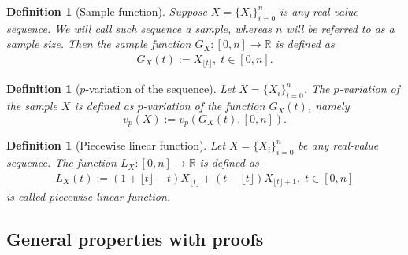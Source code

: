 \documentclass[12pt, a4paper]{article}
\newtheorem{definition}[theorem]{Definition}
\numberwithin{equation}{section}
\begin{document}
\begin{definition}[Sample function]\label{def:Seq2Fun}
  Suppose $X=\{X_{i}\}_{i=0}^{n}$ is any real-value sequence. 
  We will call such sequence a \emph{sample}, 
  whereas $n$ will be referred to as a \emph{sample size}.
  Then the \emph{sample function}  
  $G_X:[0,n] \rightarrow \mathbb{R}$ is defined as 
  \begin{eqnarray}
    G_X(t) := X_{\lfloor t \rfloor},\;t\in[0,n].
  \end{eqnarray}
\end{definition} 

\begin{definition}[$p$-variation of the sequence]\label{def:pvarseq}
  Let $X=\{X_i\}_{i=0}^n$. The $p$-variation
  of the sample $X$ is defined as $p$-variation of the function $G_X(t)$, namely
  \begin{equation}
    v_p(X) := v_p(G_X(t),[0,n]).
  \end{equation}
\end{definition}

\begin{definition}[Piecewise linear function]\label{def:poligon}
  Let $X=\{X_i\}_{i=0}^n$ be any real-value sequence. 
  The function $L_X:[0,n] \rightarrow \mathbb{R}$ is defined as
  \begin{eqnarray}
  L_X(t) := (1+\lfloor t \rfloor-t)X_{\lfloor t \rfloor} + (t-\lfloor t \rfloor)X_{\lfloor t \rfloor+1}   ,\;t\in[0,n]
  \end{eqnarray}
  is called \emph{piecewise linear function}.
\end{definition}


\subsection{General properties with proofs}
\end{document}

